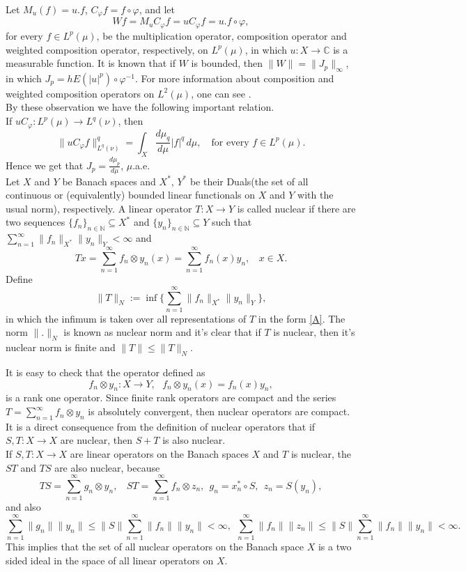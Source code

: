 \documentclass{amsart}
\theoremstyle{definition}\newtheorem{defn}[thm]{Definition}
\theoremstyle{remark}
\numberwithin{equation}{section}
\begin{document}
 
Let $M_u(f)=u.f$, $C_{\varphi}f=f\circ\varphi$, and let 
$$Wf=M_uC_{\varphi}f=uC_{\varphi}f=u.f\circ \varphi,$$
for every $f\in L^p(\mu)$, be the multiplication operator, composition operator and weighted composition operator, respectively, on $L^p(\mu)$, in which $u:X\rightarrow \mathbb{C}$ is a measurable function. It is known that if $W$ is bounded, then $\|W\|=\|J_p\|_{\infty}$, in which $J_p=hE(|u|^p)\circ\varphi^{-1}$. For more information about composition and weighted composition operators on $L^2(\mu)$, one can see \cite{bbl,cj}.\\
By these observation we have the following important relation.\\
If $uC_\varphi : L^p(\mu) \to L^q(\nu)$, then
\[
\|u C_\varphi f\|_{L^q(\nu)}^q
= \int_X \frac{d\mu_q}{d\mu} |f|^q \, d\mu,
\quad \text{for every } f \in L^p(\mu).
\]
Hence we get that $J_p=\frac{d\mu_p}{d\mu}$, $\mu$.a.e.\\
Let $X$ and $Y$ be Banach spaces and $X^*$, $Y^*$ be their Duals(the set of all continuous or (equivalently) bounded linear functionals on $X$ and $Y$ with the usual norm), respectively. A linear operator $T:X\rightarrow Y$ is called nuclear if there are two sequences $\{f_n\}_{n\in \mathbb{N}}\subseteq X^*$ and $\{y_n\}_{n\in \mathbb{N}}\subseteq Y$ such that $\sum^{\infty}_{n=1}\|f_n\|_{X^*}\|y_n\|_{Y}<\infty$ and
\begin{equation}\label{A}
Tx=\sum^{\infty}_{n=1}f_n\otimes y_n(x)=\sum^{\infty}_{n=1}f_n(x)y_n, \ \ \ \ x\in X.
\end{equation}
Define
$$\|T\|_N:=\inf\{\sum^{\infty}_{n=1}\|f_n\|_{X^*}\|y_n\|_Y\},$$
in which the infimum is taken over all representations of $T$ in the form \ref{A}. The norm $\|.\|_N$ is known as nuclear norm and it's clear that if $T$ is nuclear, then it's nuclear norm is finite and $\|T\|\leq \|T\|_N$.


It is easy to check that the operator defined as
$$f_n\otimes y_n:X\rightarrow Y, \ \ \ f_n\otimes y_n(x)=f_n(x)y_n,$$
is a rank one operator. Since finite rank operators are compact and the series $T=\sum^{\infty}_{n=1}f_n\otimes y_n$ is absolutely convergent, then nuclear operators are compact. It is a direct consequence from the definition of nuclear operators that if $S, T:X\rightarrow X$ are nuclear, then $S+T$ is also nuclear.\\
If $S, T:X\rightarrow X$ are linear operators on the Banach spaces $X$ and $T$ is nuclear, the $ST$ and $TS$ are also nuclear, because
$$TS=\sum^{\infty}_{n=1}g_n\otimes y_n, \ \ \ \ ST=\sum^{\infty}_{n=1}f_n\otimes z_n, \ \ g_n=x^*_n\circ S,  \ \ z_n=S(y_n),$$
and also
$$\sum^{\infty}_{n=1}\|g_n\|\|y_n\|\leq \|S\|\sum^{\infty}_{n=1}\|f_n\|\|y_n\|<\infty, \ \ \sum^{\infty}_{n=1}\|f_n\|\|z_n\|\leq \|S\|\sum^{\infty}_{n=1}\|f_n\|\|y_n\|<\infty.$$
This implies that the set of all nuclear operators on the Banach space $X$ is a two sided ideal in the space of all linear operators on $X$.
\end{document}
